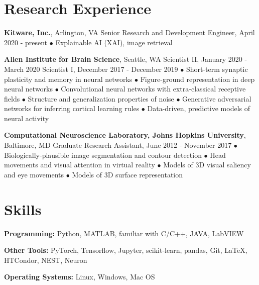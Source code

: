 \documentclass[10pt,letterpaper]{article}
\renewenvironment{itemize}{
  \begin{list}{}{
    \setlength{\leftmargin}{1.5em}
    \setlength{\itemsep}{0.25em}
    \setlength{\parskip}{0pt}
    \setlength{\parsep}{0.25em}
  }
}{
  \end{list}
}
\begin{document}
\section*{Research Experience}
\vspace{-0.05in}
\begin{itemize}
  \item \textbf{Kitware, Inc.}, Arlington, VA
  \subitem Senior Research and Development Engineer, April 2020 - present
  \subitem$\bullet$ Explainable AI (XAI), image retrieval

  \item \textbf{Allen Institute for Brain Science}, Seattle, WA
  \subitem Scientist II, January 2020 - March 2020
  \subitem Scientist I, December 2017 - December 2019
  \subitem$\bullet$ Short-term synaptic plasticity and memory in neural networks
  \subitem$\bullet$ Figure-ground representation in deep neural networks
  \subitem$\bullet$ Convolutional neural networks with extra-classical receptive fields
  \subitem$\bullet$ Structure and generalization properties of noise
  \subitem$\bullet$ Generative adversarial networks for inferring cortical learning rules
  \subitem$\bullet$ Data-driven, predictive models of neural activity
  
  \item \textbf{Computational Neuroscience Laboratory, Johns Hopkins University}, Baltimore, MD
  \subitem Graduate Research Assistant, June 2012 - November 2017
  \subitem$\bullet$ Biologically-plausible image segmentation and contour detection
  \subitem$\bullet$ Head movements and visual attention in virtual reality
  \subitem$\bullet$ Models of 3D visual saliency and eye movements
  \subitem$\bullet$ Models of 3D surface representation
\end{itemize}

\vspace{-0.25in}

\section*{Skills}
\vspace{-0.05in}
\hspace{1.5em}\textbf{Programming:} Python, MATLAB, familiar with C/C++, JAVA, LabVIEW

\hspace{1.5em}\textbf{Other Tools:} PyTorch, Tensorflow, Jupyter, scikit-learn, pandas, Git, \LaTeX, HTCondor, NEST, Neuron

\hspace{1.5em}\textbf{Operating Systems:} Linux, Windows, Mac OS
\end{document}
